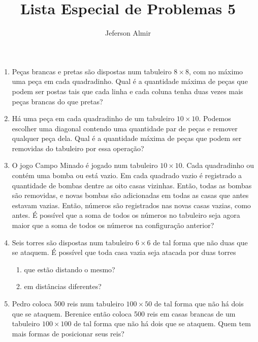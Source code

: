 \documentclass{article}
\title{Lista Especial de Problemas 5}
\author{Jeferson Almir}
\date{}
\begin{document}
\maketitle

\begin{enumerate}
    \item Peças brancas e pretas são dispostas num tabuleiro $8\times 8$,
    com no máximo uma peça em cada quadradinho.
    Qual é a quantidade máxima de peças que podem ser postas tais que
    cada linha e cada coluna tenha duas vezes mais peças brancas do que pretas?
    
    \item Há uma peça em cada quadradinho de um tabuleiro $10\times 10$.
    Podemos escolher uma diagonal contendo uma quantidade par de peças
    e remover qualquer peça dela.
    Qual é a quantidade máxima de peças que podem ser removidas do tabuleiro por essa operação?
    
    \item O jogo Campo Minado é jogado num tabuleiro $10\times 10$.
    Cada quadradinho ou contém uma bomba ou está vazio.
    Em cada quadrado vazio é registrado a quantidade de bombas dentre as oito casas vizinhas.
    Então, todas as bombas são removidas,
    e novas bombas são adicionadas em todas as casas que antes estavam vazias.
    Então, números são registrados nas novas casas vazias, como antes.
    É possível que a soma de todos os números no tabuleiro seja agora
    maior que a soma de todos os números na configuração anterior?
    
    \item Seis torres são dispostas num tabuleiro $6\times 6$
    de tal forma que não duas que se ataquem.
    É possível que toda casa vazia seja atacada por duas torres
    
    \begin{enumerate}
    \item que estão distando o mesmo?
    
    \item em distâncias diferentes?
    \end{enumerate}
    
    \item Pedro coloca 500 reis num tabuleiro $100\times 50$
    de tal forma que não há dois que se ataquem.
    Berenice então coloca 500 reis em casas brancas de um tabuleiro $100 \times 100$ de tal forma que não há dois que se ataquem.
    Quem tem mais formas de posicionar seus reis?
    

\end{enumerate}
\end{document}
